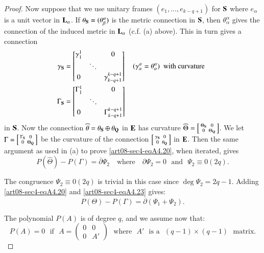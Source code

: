 \begin{proof}
Now suppose that we use unitary frames $(e_{1},\ldots,e_{k-q+1})$ for $\mathbf{S}$ where $e_{\alpha}$ is a unit vector in $\mathbf{L}_{\alpha}$. If $\theta_{\mathbf{S}}=(\theta^{\alpha}_{\beta})$ is the metric connection in $\mathbf{S}$, then $\theta^{\alpha}_{\alpha}$ gives the connection of the induced metric in $\mathbf{L}_{\alpha}$ (c.f. (a) above). This in turn gives a connection
\begin{align*}
\gamma_{\mathbf{S}} &=
\begin{bmatrix}
\gamma^{1}_{1} & & 0\\
 & \ddots & \\
0 & & \gamma^{k-q+1}_{k-q+1}
\end{bmatrix}\quad 
(\gamma^{\alpha}_{\alpha}=\theta^{\alpha}_{\alpha})\text{~ with curvature~ }\\
\Gamma_{\mathbf{S}} &=
\begin{bmatrix}
\Gamma^{1}_{1} & & 0\\
        & \ddots & \\
0 & & \Gamma^{k-q+1}_{k-q+1}
\end{bmatrix}
\end{align*}
in $\mathbf{S}$. Now the connection $\widehat{\theta}=\theta_{\mathbf{S}}\oplus \theta_{\mathbf{Q}}$ in $\mathbf{E}$ has curvature $\widehat{\Theta}=\left[\begin{smallmatrix} \Theta_{\mathbf{S}} & 0\\ 0 & \Theta_{\mathbf{Q}}\end{smallmatrix}\right]$. We let $\Gamma=\left[\begin{smallmatrix} \Gamma_{\mathbf{S}} & 0\\ 0 & \Theta_{\mathbf{Q}}\end{smallmatrix}\right]$ be the curvature of the connection $\left[\begin{smallmatrix} \gamma_{\mathbf{S}} & 0\\ 0 & \theta_{\mathbf{Q}}\end{smallmatrix}\right]$ in $\mathbf{E}$. Then the same argument as used in (a) to prove \eqref{art08-sec4-eqA4.20}, when iterated, gives
\begin{equation*}
P(\widehat{\Theta})-P(\Gamma)=\overline{\partial}\Psi_{2}\quad\text{where}\quad \partial \Psi_{2}=0\text{~ and~ } \Psi_{2}\equiv 0(2q).\tag{A4.23}\label{art08-sec4-eqA4.23}
\end{equation*}

The congruence $\Psi_{2}\equiv 0(2q)$ is trivial in this case since $\deg \Psi_{2}=2q-1$. Adding \eqref{art08-sec4-eqA4.20} and \eqref{art08-sec4-eqA4.23} gives:
\begin{equation*}
P(\Theta)-P(\Gamma)=\overline{\partial}(\Psi_{1}+\Psi_{2}).\tag{A4.24}\label{art08-sec4-eqA4.24}
\end{equation*}

The polynomial $P(A)$ is of degree $q$, and we assume now that: 
\begin{equation*}
P(A)=0 \text{~ if~ } A=\left(\begin{matrix}0 & 0\\ 0 & A'\end{matrix}\right)\text{~ where~ } A' \text{~ is a~ } (q-1)\times (q-1)\text{~ matrix.}\tag{A4.25}\label{art08-sec4-eqA4.25}
\end{equation*}
\end{proof}

